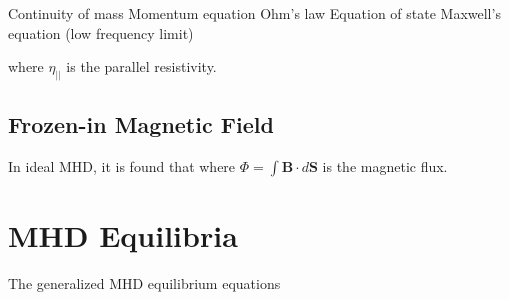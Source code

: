 \noindent Continuity of mass
\indent {}
\noindent Momentum equation
\indent {}
\noindent Ohm's law
\indent 
{}
\noindent Equation of state
\indent {}
\noindent Maxwell's equation (low frequency limit)
\indent 

\indent where $\eta_{||}$ is the parallel resistivity.

\subsection{Frozen-in Magnetic Field}
In ideal MHD, it is found that  
\indent where $\Phi = \int \textbf{B} \cdot d\textbf{S}$ is the magnetic flux.

\section{MHD Equilibria} %

\noindent
The generalized MHD equilibrium equations 


